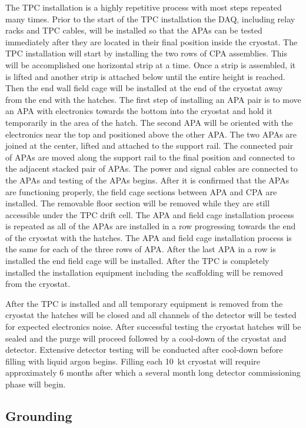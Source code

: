The TPC installation is a highly repetitive process with most steps
repeated many times. Prior to the start of the TPC installation the
DAQ, including relay racks and TPC cables, will be installed so that
the APAs can be tested immediately after they are located in their
final position inside the cryostat. The TPC installation will start by
installing the two rows of CPA assemblies. This will be accomplished
one horizontal strip at a time. Once a strip is assembled, it is
lifted and another strip is attached below until the entire height is
reached. Then the end wall field cage will be installed at the end of
the cryostat away from the end with the hatches. The first step of
installing an APA pair is to move an APA with electronics towards the
bottom into the cryostat and hold it temporarily in the area of the
hatch. The second APA will be oriented with the electronics near the
top and positioned above the other APA. The two APAs are joined at the
center, lifted and attached to the support rail. The connected pair of
APAs are moved along the support rail to the final position and
connected to the adjacent stacked pair of APAs.  The power and signal
cables are connected to the APAs and testing of the APAs begins. After
it is confirmed that the APAs are functioning properly, the field cage
sections between APA and CPA are installed. The removable floor
section will be removed while they are still accessible under the TPC
drift cell.  The APA and field cage installation process is repeated
as all of the APAs are installed in a row progressing towards the end
of the cryostat with the hatches. The APA and field cage installation
process is the same for each of the three rows of APA. After the last
APA in a row is installed the end field cage will be installed. After
the TPC is completely installed the installation equipment including
the scaffolding will be removed from the cryostat.

After the TPC is installed and all temporary equipment is removed from
the cryostat the hatches will be closed and all channels of the
detector will be tested for expected electronics noise. After
successful testing the cryostat hatches will be sealed and the purge
will proceed followed by a cool-down of the cryostat and detector.
Extensive detector testing will be conducted after cool-down before
filling with liquid argon begins. Filling each 10~kt cryostat will
require approximately 6 months after which a several month long
detector commissioning phase will begin.

\subsection{Grounding}
\label{sec:detectors-fd-ref-install-ground}

